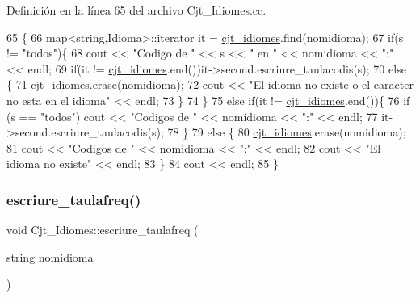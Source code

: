 Definición en la línea 65 del archivo Cjt\+\_\+\+Idiomes.\+cc.


\begin{DoxyCode}
65                                                                \{
66     map<string,Idioma>::iterator it = \hyperlink{class_cjt___idiomes_a1d294e628332477cbb3334cd8fb490a4}{cjt\_idiomes}.find(nomidioma);
67     \textcolor{keywordflow}{if}(s != \textcolor{stringliteral}{"todos"})\{
68         cout << \textcolor{stringliteral}{"Codigo de "} << s << \textcolor{stringliteral}{" en "} << nomidioma << \textcolor{stringliteral}{":"} << endl;
69         \textcolor{keywordflow}{if}(it != \hyperlink{class_cjt___idiomes_a1d294e628332477cbb3334cd8fb490a4}{cjt\_idiomes}.end())it->second.escriure\_taulacodis(s);
70         \textcolor{keywordflow}{else} \{
71             \hyperlink{class_cjt___idiomes_a1d294e628332477cbb3334cd8fb490a4}{cjt\_idiomes}.erase(nomidioma);
72             cout << \textcolor{stringliteral}{"El idioma no existe o el caracter no esta en el idioma"} << endl;
73         \}
74     \}
75     \textcolor{keywordflow}{else} \textcolor{keywordflow}{if}(it != \hyperlink{class_cjt___idiomes_a1d294e628332477cbb3334cd8fb490a4}{cjt\_idiomes}.end())\{
76         \textcolor{keywordflow}{if} (s == \textcolor{stringliteral}{"todos"}) cout << \textcolor{stringliteral}{"Codigos de "} << nomidioma << \textcolor{stringliteral}{":"} << endl;
77         it->second.escriure\_taulacodis(s);
78     \}
79     \textcolor{keywordflow}{else} \{
80         \hyperlink{class_cjt___idiomes_a1d294e628332477cbb3334cd8fb490a4}{cjt\_idiomes}.erase(nomidioma);
81         cout << \textcolor{stringliteral}{"Codigos de "} << nomidioma << \textcolor{stringliteral}{":"} << endl;
82         cout << \textcolor{stringliteral}{"El idioma no existe"} << endl;
83     \}
84     cout << endl;
85 \}
\end{DoxyCode}
\mbox{\label{class_cjt___idiomes_a98862ab41b59ac71eca4408e2b6bf6f0}} 
\subsubsection{\texorpdfstring{escriure\+\_\+taulafreq()}{escriure\_taulafreq()}}
{\footnotesize\ttfamily void Cjt\+\_\+\+Idiomes\+::escriure\+\_\+taulafreq (\begin{DoxyParamCaption}\item[{string}]{nomidioma }\end{DoxyParamCaption})}



